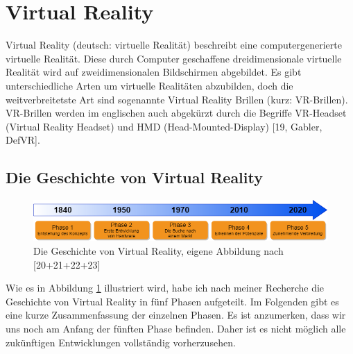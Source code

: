 
\section{Virtual Reality}\label{sec:VR}
Virtual Reality (deutsch: virtuelle Realität) beschreibt eine computergenerierte virtuelle Realität. Diese durch Computer geschaffene dreidimensionale virtuelle Realität wird auf zweidimensionalen Bildschirmen abgebildet. Es gibt unterschiedliche Arten um virtuelle Realitäten abzubilden, doch die weitverbreitetste Art sind sogenannte Virtual Reality Brillen (kurz: VR-Brillen). VR-Brillen werden im englischen auch abgekürzt durch die Begriffe VR-Headset (Virtual Reality Headset) und HMD (Head-Mounted-Display) [19, Gabler, DefVR].

\subsection{Die Geschichte von Virtual Reality}\label{sec:VRGeschichte}
\begin{figure}[h]
	\centering
	\includegraphics[width=1\linewidth]{Bilder/A12_GeschichteVR}
	\caption{Die Geschichte von Virtual Reality, eigene Abbildung nach [20+21+22+23]}
	\label{fig:GeschichteVR}
\end{figure}
\noindent Wie es in Abbildung \ref{fig:GeschichteVR} illustriert wird, habe ich nach meiner Recherche die Geschichte von Virtual Reality in fünf Phasen aufgeteilt. Im Folgenden gibt es eine kurze Zusammenfassung der einzelnen Phasen. Es ist anzumerken, dass wir uns noch am Anfang der fünften Phase befinden. Daher ist es nicht möglich alle zukünftigen Entwicklungen vollständig vorherzusehen.

